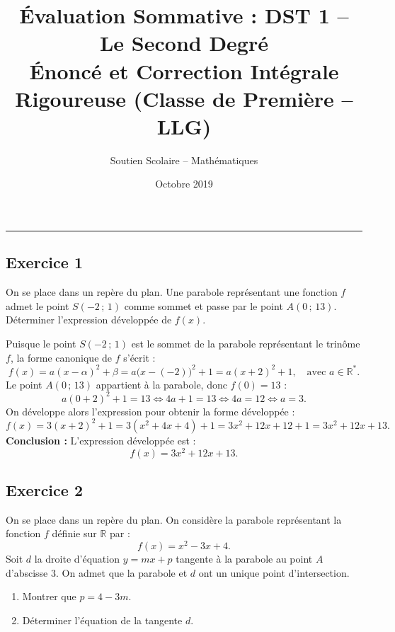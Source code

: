 \documentclass[11pt,a4paper]{article}
\title{\textbf{Évaluation Sommative : DST 1 -- Le Second Degré}\\\large Énoncé et Correction Intégrale Rigoureuse (Classe de Première -- LLG)}
\author{Soutien Scolaire -- Mathématiques}
\date{Octobre 2019}
\newcommand{\R}{\mathbb{R}}
\begin{document}
\maketitle

\hrule
\vspace{0.6cm}

\subsection*{Exercice 1}
On se place dans un repère du plan. Une parabole représentant une fonction $f$ admet le point $S(-2\,;\,1)$ comme sommet et passe par le point $A(0\,;\,13)$.
Déterminer l'expression développée de $f(x)$.

\begin{correctionbox}
Puisque le point $S(-2\,;\,1)$ est le sommet de la parabole représentant le trinôme $f$, la forme canonique de $f$ s'écrit :
\[
f(x) = a(x - \alpha)^2 + \beta = a\bigl(x - (-2)\bigr)^2 + 1 = a(x + 2)^2 + 1, \quad \text{avec } a \in \R^*.
\]
Le point $A(0\,;\,13)$ appartient à la parabole, donc $f(0) = 13$ :
\[
a(0 + 2)^2 + 1 = 13 \iff 4a + 1 = 13 \iff 4a = 12 \iff a = 3.
\]
On développe alors l'expression pour obtenir la forme développée :
\[
f(x) = 3(x+2)^2 + 1 = 3(x^2 + 4x + 4) + 1 = 3x^2 + 12x + 12 + 1 = 3x^2 + 12x + 13.
\]
\textbf{Conclusion :} L'expression développée est :
\[
f(x) = 3x^2 + 12x + 13.
\]
\end{correctionbox}

\subsection*{Exercice 2}
On se place dans un repère du plan. On considère la parabole représentant la fonction $f$ définie sur $\R$ par :
\[
f(x) = x^2 - 3x + 4.
\]
Soit $d$ la droite d'équation $y = mx + p$ tangente à la parabole au point $A$ d'abscisse $3$. On admet que la parabole et $d$ ont un unique point d'intersection.
\begin{enumerate}
    \item Montrer que $p = 4 - 3m$.
    \item Déterminer l'équation de la tangente $d$.
\end{enumerate}
\end{document}
